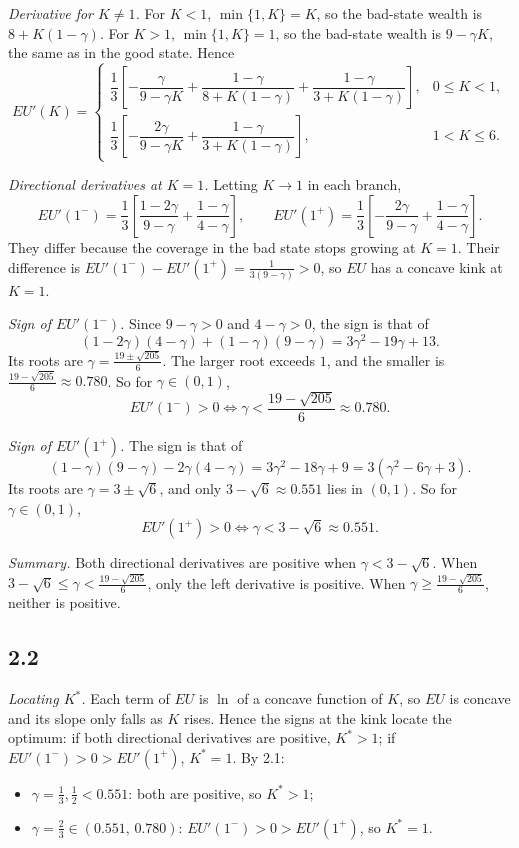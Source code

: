 \documentclass[12pt,letterpaper]{article}
\begin{document}
\textit{Derivative for $K\ne1$.} For $K<1$, $\min\{1,K\}=K$, so the bad-state wealth is $8+K(1-\gamma)$. For $K>1$, $\min\{1,K\}=1$, so the bad-state wealth is $9-\gamma K$, the same as in the good state. Hence
\[
EU'(K)=
\begin{cases}
\dfrac13\left[-\dfrac{\gamma}{9-\gamma K}+\dfrac{1-\gamma}{8+K(1-\gamma)}+\dfrac{1-\gamma}{3+K(1-\gamma)}\right], & 0\le K<1,\\[14pt]
\dfrac13\left[-\dfrac{2\gamma}{9-\gamma K}+\dfrac{1-\gamma}{3+K(1-\gamma)}\right], & 1<K\le 6.
\end{cases}
\]

\textit{Directional derivatives at $K=1$.} Letting $K\to1$ in each branch,
\[
EU'(1^-)=\frac13\left[\frac{1-2\gamma}{9-\gamma}+\frac{1-\gamma}{4-\gamma}\right],
\qquad
EU'(1^+)=\frac13\left[-\frac{2\gamma}{9-\gamma}+\frac{1-\gamma}{4-\gamma}\right].
\]
They differ because the coverage in the bad state stops growing at $K=1$. Their difference is $EU'(1^-)-EU'(1^+)=\frac{1}{3(9-\gamma)}>0$, so $EU$ has a concave kink at $K=1$.

\textit{Sign of $EU'(1^-)$.} Since $9-\gamma>0$ and $4-\gamma>0$, the sign is that of
\[
(1-2\gamma)(4-\gamma)+(1-\gamma)(9-\gamma)=3\gamma^2-19\gamma+13 .
\]
Its roots are $\gamma=\frac{19\pm\sqrt{205}}{6}$. The larger root exceeds $1$, and the smaller is $\frac{19-\sqrt{205}}{6}\approx0.780$. So for $\gamma\in(0,1)$,
\[
EU'(1^-)>0\iff\gamma<\frac{19-\sqrt{205}}{6}\approx0.780 .
\]

\textit{Sign of $EU'(1^+)$.} The sign is that of
\[
(1-\gamma)(9-\gamma)-2\gamma(4-\gamma)=3\gamma^2-18\gamma+9=3(\gamma^2-6\gamma+3).
\]
Its roots are $\gamma=3\pm\sqrt6$, and only $3-\sqrt6\approx0.551$ lies in $(0,1)$. So for $\gamma\in(0,1)$,
\[
EU'(1^+)>0\iff\gamma<3-\sqrt6\approx0.551 .
\]

\textit{Summary.} Both directional derivatives are positive when $\gamma<3-\sqrt6$. When $3-\sqrt6\le\gamma<\frac{19-\sqrt{205}}{6}$, only the left derivative is positive. When $\gamma\ge\frac{19-\sqrt{205}}{6}$, neither is positive.

\subsection*{2.2}

\textit{Locating $K^*$.} Each term of $EU$ is $\ln$ of a concave function of $K$, so $EU$ is concave and its slope only falls as $K$ rises. Hence the signs at the kink locate the optimum: if both directional derivatives are positive, $K^*>1$; if $EU'(1^-)>0>EU'(1^+)$, $K^*=1$. By 2.1:
\begin{itemize}
  \item $\gamma=\tfrac13,\tfrac12<0.551$: both are positive, so $K^*>1$;
  \item $\gamma=\tfrac23\in(0.551,\,0.780)$: $EU'(1^-)>0>EU'(1^+)$, so $K^*=1$.
\end{itemize}
\end{document}
